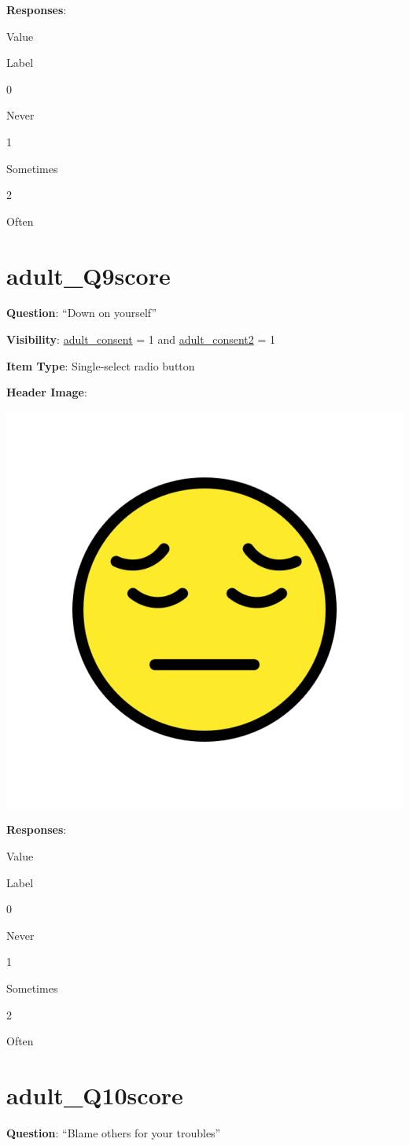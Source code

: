 \documentclass[]{book}
\begin{document}
\textbf{Responses}:

Value

Label

0

Never

1

Sometimes

2

Often

\hypertarget{adult_q9score}{%
\section{adult\_Q9score}\label{adult_q9score}}

\textbf{Question}: ``Down on yourself''

\textbf{Visibility}: \protect\hyperlink{adult_consent}{adult\_consent} = 1 and \protect\hyperlink{adult_consent2}{adult\_consent2} = 1

\textbf{Item Type}: Single-select radio button

\textbf{Header Image}:

\begin{flushleft}\includegraphics[width=0.33\linewidth]{downloadFigs4latex_HBN_PMHS_Codebook/adult_Q9score_headerImg} \end{flushleft}

\textbf{Responses}:

Value

Label

0

Never

1

Sometimes

2

Often

\hypertarget{adult_q10score}{%
\section{adult\_Q10score}\label{adult_q10score}}

\textbf{Question}: ``Blame others for your troubles''
\end{document}
